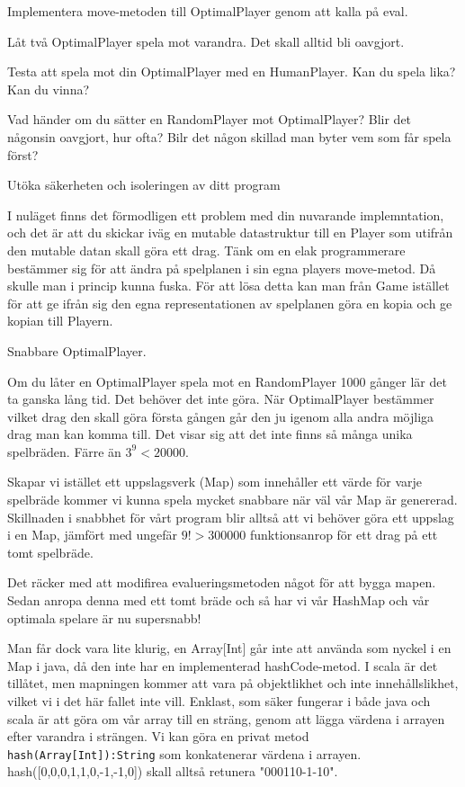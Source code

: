 \Subtask Implementera move-metoden till OptimalPlayer genom att kalla på eval.

\Subtask Låt två OptimalPlayer spela mot varandra. Det skall alltid bli oavgjort.

\Subtask Testa att spela mot din OptimalPlayer med en HumanPlayer. Kan du spela lika? Kan du vinna?

\Subtask Vad händer om du sätter en RandomPlayer mot OptimalPlayer? Blir det någonsin oavgjort, hur ofta? Bilr det någon skillad man byter vem som får spela först?

\Task Utöka säkerheten och isoleringen av ditt program

I nuläget finns det förmodligen ett problem med din nuvarande implemntation, och det är att du skickar iväg en mutable datastruktur till en Player som utifrån den mutable datan skall göra ett drag. Tänk om en elak programmerare bestämmer sig för att ändra på spelplanen i sin egna players move-metod. Då skulle man i princip kunna fuska. För att lösa detta kan man från Game istället för att ge ifrån sig den egna representationen av spelplanen göra en kopia och ge kopian till Playern.

\Task Snabbare OptimalPlayer.

Om du låter en OptimalPlayer spela mot en RandomPlayer 1000 gånger lär det ta ganska lång tid. Det behöver det inte göra. När OptimalPlayer bestämmer vilket drag den skall göra första gången går den ju igenom alla andra möjliga drag man kan komma till. Det visar sig att det inte finns så många unika spelbräden. Färre än $3^9 < 20000$. 

Skapar vi istället ett uppslagsverk (Map) som innehåller ett värde för varje spelbräde kommer vi kunna spela mycket snabbare när väl vår Map är genererad. Skillnaden i snabbhet för vårt program blir alltså att vi behöver göra ett uppslag i en Map, jämfört med ungefär $9! > 300000$ funktionsanrop för ett drag på ett tomt spelbräde. 

Det räcker med att modifirea evalueringsmetoden något för att bygga mapen. Sedan anropa denna med ett tomt bräde och så har vi vår HashMap och vår optimala spelare är nu supersnabb!

Man får dock vara lite klurig, en Array[Int] går inte att använda som nyckel i en Map i java, då den inte har en implementerad hashCode-metod. I scala är det tillåtet, men mapningen kommer att vara på objektlikhet och inte innehållslikhet, vilket vi i det här fallet inte vill. Enklast, som säker fungerar i både java och scala är att göra om vår array till en sträng, genom att lägga värdena i arrayen efter varandra i strängen. Vi kan göra en privat metod \texttt{hash(Array[Int]):String} som konkatenerar värdena i arrayen. hash([0,0,0,1,1,0,-1,-1,0]) skall alltså retunera "000110-1-10".

